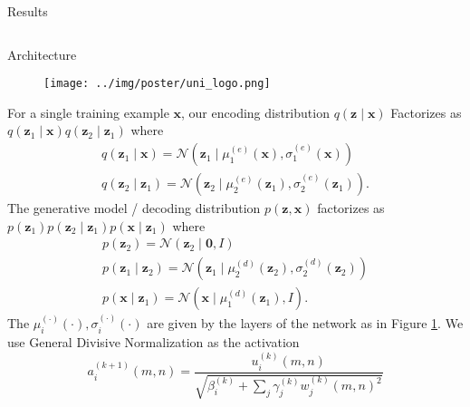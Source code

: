 \documentclass[final]{beamer}
\newlength{\onecolwid}
\newlength{\twocolwid}
\renewcommand{\vec}[1]{\mathbf{#1}}
\newcommand{\N}{\mathcal{N}}
\begin{document}
\begin{frame}[t]
\begin{columns}[t]
\begin{column}{\twocolwid}
\begin{block}{Results}
\end{block}


\begin{columns}[t,totalwidth=\twocolwid] %

\begin{column}{\onecolwid} %


\begin{block}{Architecture}
  \begin{figure}[H]
    \centering
    \texttt{[image: ../img/poster/uni\_logo.png]}
    \label{fig:architecture}
  \end{figure}

  \noindent
  For a single training example $\vec{x}$, our encoding distribution $q(\vec{z} \mid \vec{x})$
  Factorizes as $q(\vec{z}_1 \mid \vec{x})q(\vec{z}_2 \mid \vec{z}_1)$ where
  \begin{gather*}
    q(\vec{z}_1 \mid \vec{x}) = \N(\vec{z}_1 \mid \mu^{(e)}_1(\vec{x}),
    \sigma^{(e)}_1(\vec{x})) \\
    q(\vec{z}_2 \mid \vec{z}_1) = \N(\vec{z}_2 \mid \mu^{(e)}_2(\vec{z}_1),
    \sigma^{(e)}_2(\vec{z}_1)).
  \end{gather*}
  The generative model / decoding distribution $p(\vec{z},
  \vec{x})$ factorizes as $p(\vec{z}_1)p(\vec{z}_2\mid \vec{z}_1)p(\vec{x} \mid
  \vec{z}_1)$ where
  \begin{gather*}
    p(\vec{z}_2) = \N(\vec{z}_2 \mid \vec{0}, I) \\
    p(\vec{z}_1 \mid \vec{z}_2) = \N(\vec{z}_1 \mid \mu^{(d)}_2(\vec{z}_2),
    \sigma^{(d)}_2(\vec{z}_2)) \\ 
    p(\vec{x} \mid \vec{z}_1) = \N(\vec{x} \mid \mu^{(d)}_1(\vec{z}_1), I). 
  \end{gather*}
  The $\mu^{(\cdot)}_i(\cdot), \sigma^{(\cdot)}_i(\cdot)$ are given by the layers
  of the network as in Figure \ref{fig:architecture}.
  We use General Divisive Normalization \cite{balle2016end} as the activation
\begin{equation}
  a^{(k + 1)}_i(m, n) = \frac{u^{(k)}_i(m, n)}{\sqrt{\beta^{(k)}_i + \sum_j \gamma^{(k)}_jw^{(k)}_j(m, n)^2}}
\end{equation}


\end{block}
\end{column}
\end{columns}
\end{column}
\end{columns}
\end{frame}
\end{document}
